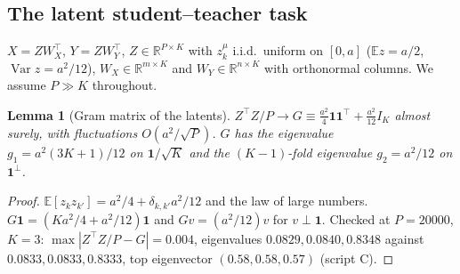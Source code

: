 \documentclass[11pt,a4paper]{article}
\newcommand{\R}{\mathbb R}
\newcommand{\E}{\mathbb E}
\newtheorem{lemma}{Lemma}
\theoremstyle{remark}
\begin{document}
\subsection{The latent student--teacher task}
\label{sec:latent}
$X = ZW_X^\top$, $Y = ZW_Y^\top$, $Z\in\R^{P\times K}$ with $z^\mu_k$ i.i.d.\ uniform on $[0,a]$ ($\E z = a/2$, $\operatorname{Var}z = a^2/12$), $W_X\in\R^{m\times K}$ and $W_Y\in\R^{n\times K}$ with orthonormal columns. We assume $P\gg K$ throughout.

\begin{lemma}[Gram matrix of the latents]\label{lem:gram}
$Z^\top Z/P\to G\equiv\frac{a^2}{4}\mathbf 1\mathbf 1^\top + \frac{a^2}{12}I_K$ almost surely, with fluctuations $O(a^2/\sqrt P)$. $G$ has the eigenvalue $g_1 = a^2(3K+1)/12$ on $\mathbf 1/\sqrt K$ and the $(K-1)$-fold eigenvalue $g_2 = a^2/12$ on $\mathbf 1^\perp$.
\end{lemma}
\begin{proof}
$\E[z_kz_{k'}] = a^2/4 + \delta_{k,k'}a^2/12$ and the law of large numbers. $G\mathbf 1 = (Ka^2/4 + a^2/12)\mathbf 1$ and $Gv = (a^2/12)v$ for $v\perp\mathbf 1$. Checked at $P = 20000$, $K = 3$: $\max|Z^\top Z/P - G| = 0.004$, eigenvalues $0.0829, 0.0840, 0.8348$ against $0.0833, 0.0833, 0.8333$, top eigenvector $(0.58, 0.58, 0.57)$ (script C).
\end{proof}
\end{document}

